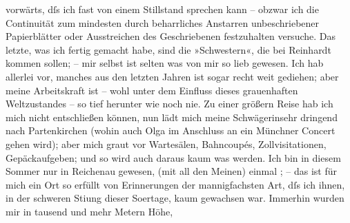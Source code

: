 \begin{ledgroupsized}[t]{13cm}
               vorwärts, dſs ich fast von einem Stillstand sprechen kann – obzwar ich die
               Continuität zum mindesten durch beharrliches Anstarren unbeschriebener Papierblätter
               oder Ausstreichen des Geschriebenen festzuhalten versuche. Das letzte, was ich fertig
               gemacht \introOben{}habe\introOben{}, sind die »Schwestern«, die bei Reinhardt kommen
               sollen; – mir selbst ist selten was von mir so lieb gewesen. Ich hab allerlei vor,
               manches aus den letzten Jahren ist sogar recht weit gediehen; aber meine Arbeitskraft
               ist – wohl unter dem Einfluss dieses grauenhaften Weltzustandes – so tief herunter
               wie noch nie. Zu einer größern Reise hab ich mich nicht entschließen können, nun lädt
               mich meine Schwägerinsehr dringend nach Partenkirchen (wohin auch Olga im
               Anschluss an ein Münchner Concert\strikeout{)} gehen wird); aber mich graut vor Wartesälen,
               Bahncoupés, Zollvisitationen, Gepäckaufgeben; und so wird auch daraus kaum was
               werden. Ich bin in diesem Sommer {\pb}nur in Reichenau gewesen, \label{K_L02327_3v}\label{K_L02327_3h} (mit
               all den Meinen) einmal \label{K_L02327_4v}\label{K_L02327_4h}; – das ist für mich ein Ort
               so erfüllt von Erinnerungen der mannigfachsten Art, dſs ich ihnen, in der schweren
                  Sti{\geminationm}ung dieser So{\geminationm}ertage, kaum gewachsen war. Immerhin wurden mir in tausend und mehr Metern Höhe,

\end{ledgroupsized}

